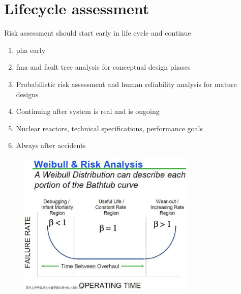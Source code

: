 \documentclass[aspectratio=1610,pdftex,dvipsnames,compress,xcolor={dvipsnames}]{beamer}
\newcommand{\acf}{\acrfull} %
\begin{document}
\section{Lifecycle assessment}


\addtocounter{framenumber}{-1}
\begin{frame}{Risk assessment should start early in life cycle and continue}
    \begin{enumerate}[series=outerlist,topsep=0pt,itemsep=15pt,leftmargin=*,label=(\arabic*)]
        \item[]\acf{pha} early
        \item[]\acf{fma} and fault tree analysis for conceptual design phases
        \item[]Probabilistic risk assessment and human reliability analysis for mature designs
        \item[]Continuing after system is real and is ongoing
        \item[]Nuclear reactors, technical specifications, performance goals
        \item[]Always after accidents
    \end{enumerate}
\end{frame}


\begin{frame}{}
    \begin{figure}
        \centering
        \includegraphics[width=0.75\textwidth]{bath.jpg}
    \end{figure}
\end{frame}
\end{document}
